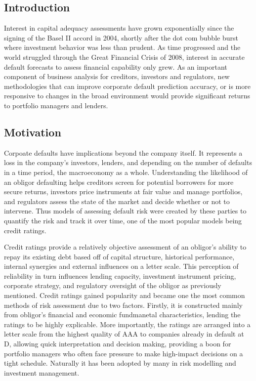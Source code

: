 \documentclass[10pt]{article}
\begin{document}
\begin{multicols*}{2}

\section{Introduction}\label{introduction}

Interest in capital adequacy assessments have grown exponentially since the signing of the Basel II accord in 2004, shortly after the dot com bubble burst where investment behavior was less than prudent.
As time progressed and the world struggled through the Great Financial Crisis of 2008, interest in accurate default forecasts to assess financial capability only grew. As an important component of business analysis 
for creditors, investors and regulators, new methodologies that can improve corporate default prediction accuracy, or is more responsive to changes in the broad environment would provide significant returns to portfolio
managers and lenders.  
 
\subsection{Motivation}\label{motivation}

Corpoate defaults have implications beyond the company itself. It represents a loss in the company's investors, lenders, and depending on the number of defaults in a time period, the macroeconomy as a whole.
Understanding the likelihood of an obligor defaulting helps creditors screen for potential borrowers for more secure returns, investors price instruments at fair value and manage portfolios, and regulators assess the state of the market and decide whether or not to intervene.
Thus models of assessing default risk were created by these parties to quantify the risk and track it over time, one of the most popular models being credit ratings.  

Credit ratings provide a relatively objective assessment of an obligor's ability to repay its existing debt based off of capital structure, historical performance, internal synergies and external influences on a letter scale.
This perception of reliability in turn influences lending capacity, investment instrument pricing, corporate strategy, and regulatory oversight of the obligor as previously mentioned. 
Credit ratings gained popularity and became one the most common methods of risk assessment due to two factors. Firstly, it is constructed mainly from obligor's financial and economic fundmanetal characteristics, lending the ratings to be highly explicable.
More importantly, the ratings are arranged into a letter scale from the highest quality of AAA to companies already in default at D, allowing quick interpretation and decision making, providing a boon for portfolio managers who often face pressure to make high-impact decisions on a tight schedule.
Naturally it has been adopted by many in risk modelling and investment management.


\end{multicols*}
\end{document}
